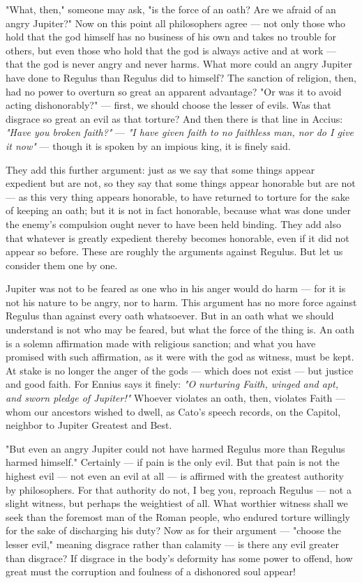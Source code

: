  "What, then," someone may ask, "is the force of an oath? Are we afraid of an angry Jupiter?" Now on this point all philosophers agree — not only those who hold that the god himself has no business of his own and takes no trouble for others, but even those who hold that the god is always active and at work — that the god is never angry and never harms. What more could an angry Jupiter have done to Regulus than Regulus did to himself? The sanction of religion, then, had no power to overturn so great an apparent advantage? "Or was it to avoid acting dishonorably?" — first, we should choose the lesser of evils. Was that disgrace so great an evil as that torture? And then there is that line in Accius: \textit{"Have you broken faith?"} — \textit{"I have given faith to no faithless man, nor do I give it now"} — though it is spoken by an impious king, it is finely said.

 They add this further argument: just as we say that some things appear expedient but are not, so they say that some things appear honorable but are not — as this very thing appears honorable, to have returned to torture for the sake of keeping an oath; but it is not in fact honorable, because what was done under the enemy's compulsion ought never to have been held binding. They add also that whatever is greatly expedient thereby becomes honorable, even if it did not appear so before. These are roughly the arguments against Regulus. But let us consider them one by one.

 Jupiter was not to be feared as one who in his anger would do harm — for it is not his nature to be angry, nor to harm. This argument has no more force against Regulus than against every oath whatsoever. But in an oath what we should understand is not who may be feared, but what the force of the thing is. An oath is a solemn affirmation made with religious sanction; and what you have promised with such affirmation, as it were with the god as witness, must be kept. At stake is no longer the anger of the gods — which does not exist — but justice and good faith. For Ennius says it finely: \textit{"O nurturing Faith, winged and apt, and sworn pledge of Jupiter!"} Whoever violates an oath, then, violates Faith — whom our ancestors wished to dwell, as Cato's speech records, on the Capitol, neighbor to Jupiter Greatest and Best.

 "But even an angry Jupiter could not have harmed Regulus more than Regulus harmed himself." Certainly — if pain is the only evil. But that pain is not the highest evil — not even an evil at all — is affirmed with the greatest authority by philosophers. For that authority do not, I beg you, reproach Regulus — not a slight witness, but perhaps the weightiest of all. What worthier witness shall we seek than the foremost man of the Roman people, who endured torture willingly for the sake of discharging his duty? Now as for their argument — "choose the lesser evil," meaning disgrace rather than calamity — is there any evil greater than disgrace? If disgrace in the body's deformity has some power to offend, how great must the corruption and foulness of a dishonored soul appear!

